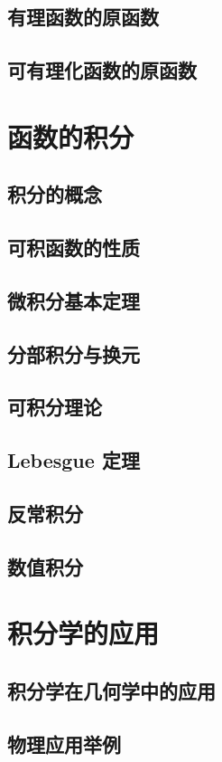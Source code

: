 \documentclass[a4paper, 11pt]{ctexbook}
\begin{document}
            \section{有理函数的原函数}
            \section{可有理化函数的原函数}
        \chapter{函数的积分}
            \section{积分的概念}
            \section{可积函数的性质}
            \section{微积分基本定理}
            \section{分部积分与换元}
            \section{可积分理论}
                
            \section{Lebesgue 定理}
            \section{反常积分}
            \section{数值积分}
        \chapter{积分学的应用}
            \section{积分学在几何学中的应用}
            \section{物理应用举例}
\end{document}
